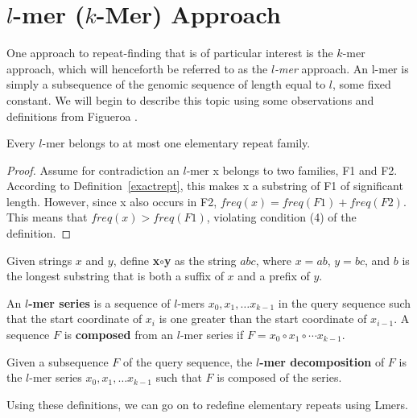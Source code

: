 \section{$l$-mer ($k$-Mer) Approach}
One approach to repeat-finding that is of particular interest is the $k$-mer approach, which will henceforth be referred to as the \textit{$l$-mer} approach. An l-mer is simply a subsequence of the genomic sequence of length equal to $l$, some fixed constant. We will begin to describe this topic using some observations and definitions from Figueroa \cite{figueroa2013raider}.

\begin{lem}
Every $l$-mer belongs to at most one elementary repeat family.
\end{lem}
\begin{proof}
Assume for contradiction an $l$-mer x belongs to two families, F1 and F2. According to Definition~\ref{exactrept}, this makes x a substring of F1 of significant length. However, since x also occurs in F2, $freq(x) = freq(F1) + freq(F2)$. This means that $freq(x) > freq(F1)$, violating condition (4) of the definition.
\end{proof}


\begin{defn}
Given strings $x$ and $y$, define \textbf{x$\circ$y} as the string $abc$, where $x=ab$, $y=bc$, and $b$ is the longest substring that is both a suffix of $x$ and a prefix of $y$.
\end{defn}

\begin{defn}
An \textbf{$l$-mer series} is a sequence of $l$-mers $x_{0}, x_{1}, \dotsc x_{k-1}$ in the query sequence such that the start coordinate of $x_{i}$ is one greater than the start coordinate of $x_{i-1}$. A sequence $F$ is \textbf{composed} from an $l$-mer series if $F=x_{0}\circ x_{1}\circ\dotsm x_{k-1}.$
\end{defn}

\begin{defn}
Given a subsequence $F$ of the query sequence, the \textbf{$l$-mer decomposition} of $F$ is the $l$-mer series $x_{0}, x_{1}, \dotsc x_{k-1}$ such that $F$ is composed of the series.
\end{defn}

Using these definitions, we can go on to redefine elementary repeats using Lmers.
